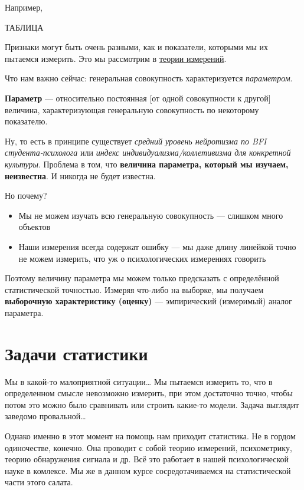 \documentclass[
  letterpaper,
  DIV=11,
  numbers=noendperiod]{scrreprt}
\providecommand{\tightlist}{%
  \setlength{\itemsep}{0pt}\setlength{\parskip}{0pt}}\usepackage{longtable,booktabs,array}
\theoremstyle{definition}
\theoremstyle{remark}
\begin{document}
Например,

ТАБЛИЦА

Признаки могут быть очень разными, как и показатели, которыми мы их
пытаемся измерить. Это мы рассмотрим в
\hyperref[measurements-social-sci]{теории измерений}.

Что нам важно сейчас: генеральная совокупность характеризуется
\emph{параметром}.

\textbf{Параметр} --- относительно постоянная {[}от одной совокупности к
другой{]} величина, характеризующая генеральную совокупность по
некоторому показателю.

Ну, то есть в принципе существует \emph{средний уровень нейротизма по
BFI студента-психолога} или \emph{индекс индивидуализма/коллетивизма для
конкретной культуры}. Проблема в том, что \textbf{величина параметра,
который мы изучаем, неизвестна}. И никогда не будет известна.

Но почему?

\begin{itemize}
\tightlist
\item
  Мы не можем изучать всю генеральную совокупность --- слишком много
  объектов
\item
  Наши измерения всегда содержат ошибку --- мы даже длину линейкой точно
  не можем измерить, что уж о психологических измерениях говорить
\end{itemize}

Поэтому величину параметра мы можем только предсказать с определённой
статистической точностью. Измеряя что-либо на выборке, мы получаем
\textbf{выборочную характеристику (оценку)} --- эмпирический (измеримый)
аналог параметра.

\section{Задачи статистики}\label{stats-goals}

Мы в какой-то малоприятной ситуации\ldots{} Мы пытаемся измерить то, что
в определенном смысле невозможно измерить, при этом достаточно точно,
чтобы потом это можно было сравнивать или строить какие-то модели.
Задача выглядит заведомо провальной\ldots{}

Однако именно в этот момент на помощь нам приходит статистика. Не в
гордом одиночестве, конечно. Она проводит с собой теорию измерений,
психометрику, теорию обнаружения сигнала и др. Всё это работает в нашей
психологической науке в комлексе. Мы же в данном курсе сосредотачиваемся
на статистической части этого салата.
\end{document}
